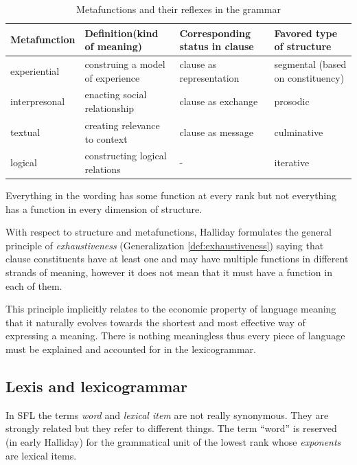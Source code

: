 \begin{table}[H]
	\centering
	\begin{tabulary}{\textwidth}{|l|L|L|L|}
		\hline
		{\bf Metafunction} & {\bf Definition(kind of meaning)} & {\bf Corresponding status in clause} & {\bf Favored type of structure}   \\ \hline
		experiential       & construing a model of experience  & clause as representation             & segmental (based on constituency) \\ \hline
		interpresonal      & enacting social relationship      & clause as exchange                   & prosodic                          \\ \hline
		textual            & creating relevance to context     & clause as message                    & culminative                       \\ \hline
		logical            & constructing logical relations    & -                                    & iterative                         \\ \hline
	\end{tabulary}
	\caption{Metafunctions and their reflexes in the grammar}
	\label{tab:metafucntions}
\end{table}

\begin{generalization}\label{def:exhaustiveness}
	Everything in the wording has some function at every rank but not everything has a function in every dimension of structure. \citep{Halliday2002,Halliday2013}
\end{generalization}

With respect to structure and metafunctions, Halliday formulates the general principle of \textit{exhaustiveness} (Generalization \ref{def:exhaustiveness}) saying that clause constituents have at least one and may have multiple functions in different strands of meaning, however it does not mean that it must have a function in each of them. 

This principle implicitly relates to the economic property of language meaning that it naturally evolves towards the shortest and most effective way of expressing a meaning. There is nothing meaningless thus every piece of language must be explained and accounted for in the lexicogrammar. 

\subsection{Lexis and lexicogrammar}
In SFL the terms \textit{word} and \textit{lexical item} are not really synonymous. They are strongly related but they refer to different things. The term ``word'' is reserved (in early Halliday) for the grammatical unit of the lowest rank whose \textit{exponents} are lexical items. %

